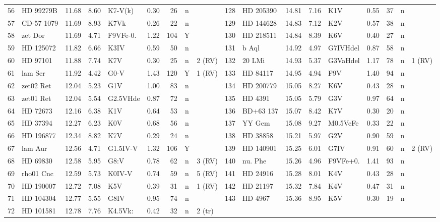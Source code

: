 \begin{landscape}
\begin{longtable}{r l r r l r r c l @{\;\vrule\;} r l r r l r r c l}
56 & HD 99279B & 11.68 & 8.60 & K7-V(k) & 0.30 & 26 & n &  & 128 & HD 205390 & 14.81 & 7.16 & K1V & 0.55 & 37 & n &  \\
57 & CD-57 1079 & 11.69 & 8.93 & K7Vk & 0.26 & 22 & n &  & 129 & HD 144628 & 14.83 & 7.12 & K2V & 0.57 & 38 & n &  \\
58 & zet Dor & 11.69 & 4.71 & F9VFe-0. & 1.22 & 104 & Y &  & 130 & HD 218511 & 14.84 & 8.39 & K6V & 0.40 & 27 & n &  \\
59 & HD 125072 & 11.82 & 6.66 & K3IV & 0.59 & 50 & n &  & 131 & b Aql & 14.92 & 4.97 & G7IVHdel & 0.87 & 58 & n &  \\
60 & HD 97101 & 11.88 & 7.74 & K7V & 0.30 & 25 & n & 2 (RV) & 132 & 20 LMi & 14.93 & 5.37 & G3VaHdel & 1.17 & 78 & n & 1 (RV) \\
61 & lam Ser & 11.92 & 4.42 & G0-V & 1.43 & 120 & Y & 1 (RV) & 133 & HD 84117 & 14.95 & 4.94 & F9V & 1.40 & 94 & n &  \\
62 & zet02 Ret & 12.04 & 5.23 & G1V & 1.00 & 83 & n &  & 134 & HD 200779 & 15.05 & 8.27 & K6V & 0.43 & 28 & n &  \\
63 & zet01 Ret & 12.04 & 5.54 & G2.5VHde & 0.87 & 72 & n &  & 135 & HD 4391 & 15.05 & 5.79 & G3V & 0.97 & 64 & n &  \\
64 & HD 72673 & 12.16 & 6.38 & K1V & 0.64 & 53 & n &  & 136 & BD+63 137 & 15.07 & 8.42 & K7V & 0.30 & 20 & n &  \\
65 & HD 37394 & 12.27 & 6.23 & K0V & 0.68 & 56 & n &  & 137 & YY Gem & 15.08 & 9.27 & M0.5VeFe & 0.33 & 22 & n &  \\
66 & HD 196877 & 12.34 & 8.82 & K7V & 0.29 & 24 & n &  & 138 & HD 38858 & 15.21 & 5.97 & G2V & 0.90 & 59 & n &  \\
67 & lam Aur & 12.56 & 4.71 & G1.5IV-V & 1.32 & 106 & Y &  & 139 & HD 140901 & 15.25 & 6.01 & G7IV & 0.91 & 60 & n & 2 (RV) \\
68 & HD 69830 & 12.58 & 5.95 & G8:V & 0.78 & 62 & n & 3 (RV) & 140 & nu. Phe & 15.26 & 4.96 & F9VFe+0. & 1.41 & 93 & n &  \\
69 & rho01 Cnc & 12.59 & 5.73 & K0IV-V & 0.74 & 59 & n & 5 (RV) & 141 & HD 24916 & 15.28 & 8.01 & K4V & 0.43 & 28 & n &  \\
70 & HD 190007 & 12.72 & 7.08 & K5V & 0.39 & 31 & n & 1 (RV) & 142 & HD 21197 & 15.32 & 7.84 & K4V & 0.47 & 31 & n &  \\
71 & HD 104304 & 12.77 & 5.55 & G8IV & 0.95 & 74 & n &  & 143 & HD 4967 & 15.36 & 8.95 & K5V & 0.30 & 19 & n &  \\
72 & HD 101581 & 12.78 & 7.76 & K4.5Vk: & 0.42 & 32 & n & 2 (tr) &  &  &  &  &  &  &  &  &  \\
\end{longtable}
\end{landscape}
